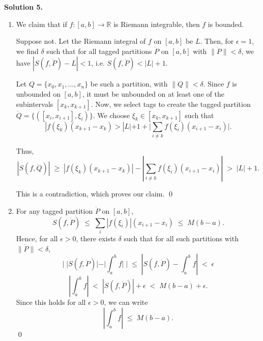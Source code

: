 \documentclass[10pt]{article}
\begin{document}
        \textbf{Solution 5.}
        \begin{enumerate}
                \item We claim that if $f\colon [a, b] \to \mathbb{R}$ is Riemann integrable, then $f$ is bounded.

                Suppose not. Let the Riemann integral of $f$ on $[a, b]$ be $L$. Then, for $\epsilon = 1$, we find $\delta$ such that
                for all tagged partitions $\dot{P}$ on $[a, b]$ with $\|\dot{P}\| < \delta$, we have $|S(f, \dot{P}) - L| < 1$,
                i.e. $S(f, \dot{P}) < |L| + 1$.

                Let $Q = \{x_0, x_1, \ldots, x_n\}$ be such a partition, with $\|Q\| < \delta$. Since $f$ is unbounded on $[a, b]$,
                it must be unbounded on at least one of the subintervals $[x_k, x_{k + 1}]$. Now, we select tags to create the tagged partition
                $\dot{Q} = \{([x_{i}, x_{i + 1}], \xi_i)\}$. We choose $\xi_k \in [x_k, x_{k + 1}]$ such that
                \[
                |f(\xi_k)(x_{k + 1} - x_{k}) > |L| + 1 + |\sum_{i \neq k} f(\xi_i)(x_{i + 1} - x_i)|.
                \]

                Thus,
                \[
                |S(f, \dot{Q})| \;\ge\; |f(\xi_k)(x_{k + 1} - x_k)| - |\sum_{i \neq k} f(\xi_i)(x_{i + 1} - x_i)| \;>\; |L| + 1.
                \]

                This is a contradiction, which proves our claim. \qed\\

                \item For any tagged partition $\dot{P}$ on $[a, b]$,
                \[S(f, \dot{P}) \;\le\; \sum_i |f(\xi_i)|(x_{i + 1} - x_{i}) \;\le\; M(b - a).\]
                Hence, for all $\epsilon > 0$, there exists $\delta$ such that for all such partitions with $\|\dot{P}\| < \delta$,
                \[ | \;|S(f, \dot{P})| - |\int_a^b f|\; | \;\le\; | S(f, \dot{P}) - \int_a^b f| \;<\; \epsilon\]
                \[
                \left|\int_a^b f \right| \;<\; |S(f, \dot{P})| + \epsilon \;<\; M(b - a) + \epsilon.
                \]
                Since this holds for all $\epsilon > 0$, we can write
                \[\left|\int_a^b f \right| \;\le\; M(b - a).\]\qed
        \end{enumerate}
\end{document}
